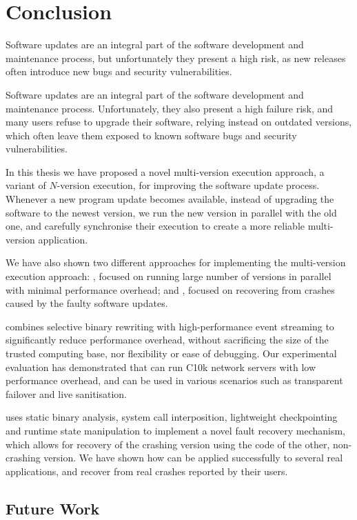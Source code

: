 \chapter{Conclusion}
\label{chap:conclusion}

Software updates are an integral part of the software development and
maintenance process, but unfortunately they present a high risk, as new
releases often introduce new bugs and security vulnerabilities.

Software updates are an integral part of the software development and
maintenance process. Unfortunately, they also present a high failure risk, and
many users refuse to upgrade their software, relying instead on outdated
versions, which often leave them exposed to known software bugs and security
vulnerabilities.

In this thesis we have proposed a novel multi-version execution approach, a
variant of $N$-version execution, for improving the software update process.
Whenever a new program update becomes available, instead of upgrading the
software to the newest version, we run the new version in parallel with the old
one, and carefully synchronise their execution to create a more reliable
multi-version application.

We have also shown two different approaches for implementing the multi-version
execution approach: \varan, focused on running large number of versions in
parallel with minimal performance overhead; and \mx, focused on recovering from
crashes caused by the faulty software updates.

\varan combines selective binary rewriting with high-performance event
streaming to significantly reduce performance overhead, without sacrificing the
size of the trusted computing base, nor flexibility or ease of debugging.  Our
experimental evaluation has demonstrated that \varan can run C10k network
servers with low performance overhead, and can be used in various scenarios
such as transparent failover and live sanitisation.

\mx uses static binary analysis, system call interposition, lightweight
checkpointing and runtime state manipulation to implement a novel fault recovery
mechanism, which allows for recovery of the crashing version using the code
of the other, non-crashing version. We have shown how \mx can be applied
successfully to several real applications, and recover from real crashes
reported by their users.

\section{Future Work}
\label{conclusion:future-work}

